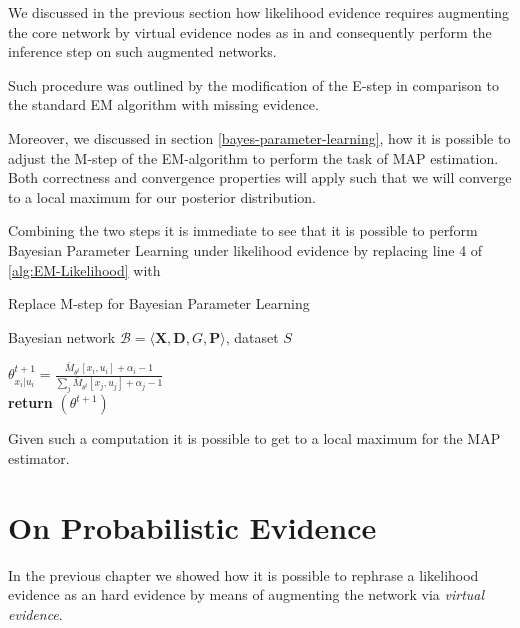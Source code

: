 \documentclass[11pt]{article}
\begin{document}
\begin{article}
We discussed in the previous section how likelihood evidence
requires augmenting the core network by virtual evidence nodes as
in \cite{pearl2014probabilistic} and consequently perform the
inference step on such augmented networks.

Such procedure was outlined by the modification of the E-step in
comparison to the standard EM algorithm with missing evidence.

Moreover, we discussed in section \ref{bayes-parameter-learning}, how
it is possible to adjust the M-step of the EM-algorithm to perform
the task of MAP estimation. Both correctness and convergence
properties will apply such that we will converge to a local maximum
for our posterior distribution.

Combining the two steps it is immediate to see that it is possible
to perform Bayesian Parameter Learning under likelihood evidence
by replacing line 4 of \ref{alg:EM-Likelihood} with 

\begin{algorithm*}[h!]
\caption{Replace M-step for Bayesian Parameter Learning}
\label{alg:Bayes-EM-Likelihood}
\vspace{-10pt}
\begin{multicols}{2}
\begin{algorithmic}[1] 
\Require Bayesian network $\mathcal{B}=\langle \mathbf{X},\mathbf{D}, G, \mathbf{P} \rangle$, dataset $S$ 

   \State $\theta_{x_{i}|u_{i}}^{t+1}=\frac{\bar{M}_{\theta^{t}}[x_{i},u_{i}] + \alpha_i - 1}{\sum_j \bar{M}_{\theta^{t}}[x_{j},u_{j}] + \alpha_j - 1}$\\
   
   \textbf{return} $(\theta^{t+1})$

\end{algorithmic}
\end{multicols}
\end{algorithm*}

Given such a computation it is possible to get to a local maximum
for the MAP estimator.


\section{On Probabilistic Evidence}
\label{sec:org72b7f90}

In the previous chapter we showed how it is possible to rephrase a
likelihood evidence as an hard evidence by means of augmenting the
network via \emph{virtual evidence}.


\end{article}
\end{document}
